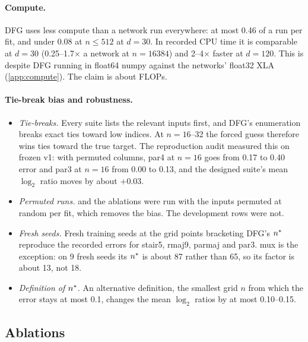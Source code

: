 \paragraph{Compute.} DFG uses less compute than a network run everywhere: at most 0.46 of a run per fit, and under 0.08 at $n\le512$ at $d=30$. In recorded CPU time it is comparable at $d=30$ (0.25--1.7$\times$ a network at $n=16384$) and 2--4$\times$ faster at $d=120$. This is despite DFG running in float64 numpy against the networks' float32 XLA (\cref{app:compute}). The claim is about FLOPs.

\paragraph{Tie-break bias and robustness.}\label{sec:tiebreak}
\begin{itemize}
\item \emph{Tie-breaks.} Every suite lists the relevant inputs first, and DFG's enumeration breaks exact ties toward low indices. At $n=16$--32 the forced guess therefore wins ties toward the true target. The reproduction audit measured this on frozen v1: with permuted columns, par4 at $n=16$ goes from 0.17 to 0.40 error and par3 at $n=16$ from 0.00 to 0.13, and the designed suite's mean $\log_2$ ratio moves by about $+0.03$.
\item \emph{Permuted runs.}  and the ablations were run with the inputs permuted at random per fit, which removes the bias. The development rows were not.
\item \emph{Fresh seeds.} Fresh training seeds at the grid points bracketing DFG's $n^{*}$ reproduce the recorded errors for stair5, rmaj9, parmaj and par3. mux is the exception: on 9 fresh seeds its $n^{*}$ is about 87 rather than 65, so its factor is about 13, not 18.
\item \emph{Definition of $n^{*}$.} An alternative definition, the smallest grid $n$ from which the error stays at most 0.1, changes the mean $\log_2$ ratios by at most 0.10--0.15.
\end{itemize}

\subsection{Ablations}\label{sec:dfgabl}

